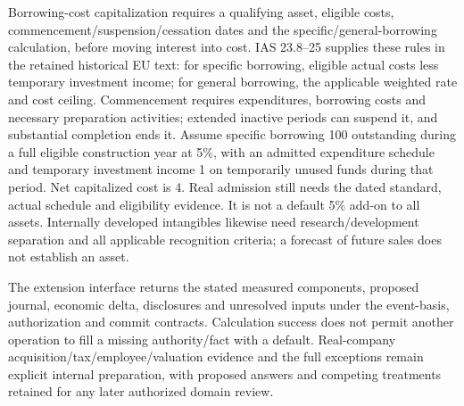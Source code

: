 Borrowing-cost capitalization requires a qualifying asset, eligible costs, commencement/suspension/cessation dates and the specific/general-borrowing calculation, before moving interest into cost. IAS 23.8--25 supplies these rules in the retained historical EU text: for specific borrowing, eligible actual costs less temporary investment income; for general borrowing, the applicable weighted rate and cost ceiling. Commencement requires expenditures, borrowing costs and necessary preparation activities; extended inactive periods can suspend it, and substantial completion ends it. Assume specific borrowing 100 outstanding during a full eligible construction year at 5\%, with an admitted expenditure schedule and temporary investment income 1 on temporarily unused funds during that period. Net capitalized cost is 4. Real admission still needs the dated standard, actual schedule and eligibility evidence. It is not a default 5\% add-on to all assets. Internally developed intangibles likewise need research/development separation and all applicable recognition criteria; a forecast of future sales does not establish an asset.

The extension interface returns the stated measured components, proposed journal, economic delta, disclosures and unresolved inputs under the event-basis, authorization and commit contracts. Calculation success does not permit another operation to fill a missing authority/fact with a default. Real-company acquisition/tax/employee/valuation evidence and the full exceptions remain explicit internal preparation, with proposed answers and competing treatments retained for any later authorized domain review.
